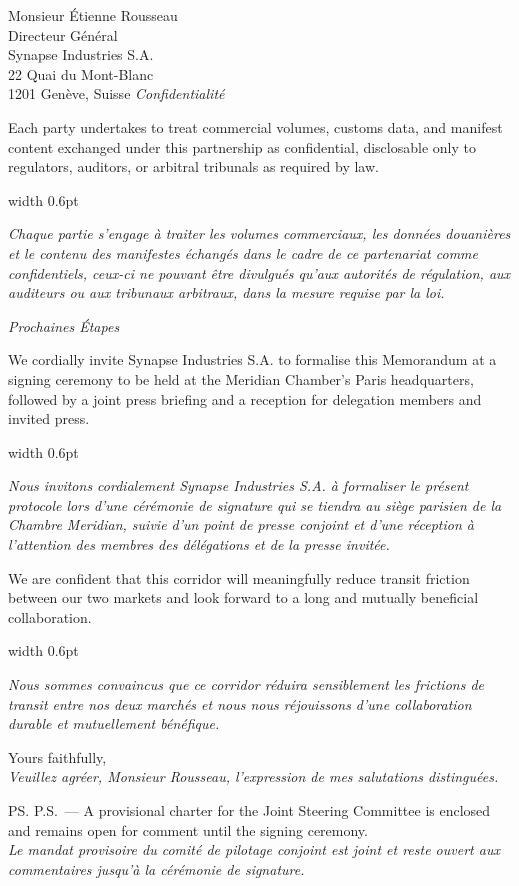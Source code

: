 \documentclass[paper=a4,fontsize=11pt,parskip=half,DIV=11,headsepline,footsepline,addrfield=true,backaddress=false,locfield=narrow,foldmarks=off,enlargefirstpage=on]{scrlttr2}
\newcommand{\bilingual}[2]{%
\noindent\begin{minipage}[t]{0.475\textwidth}\raggedright\small #1\end{minipage}\hspace{0.012\textwidth}%
{\color{gold}\vrule width 0.6pt}\hspace{0.012\textwidth}%
\begin{minipage}[t]{0.475\textwidth}\raggedright\small\itshape #2\end{minipage}\par\smallskip
}
\newcommand{\sectiontitle}[2]{%
\vspace{2pt}\noindent{\color{navy}\bfseries\large #1}\hfill{\color{gold}\itshape\small #2}\par
\noindent{\color{gold}\rule{\dimexpr\linewidth-11pt\relax}{0.7pt}}\par\smallskip
}
\begin{document}
\begin{letter}{Monsieur \'Etienne Rousseau\\Directeur G\'en\'eral\\Synapse Industries S.A.\\22 Quai du Mont-Blanc\\1201 Gen\`eve, Suisse}
\sectiontitle{Confidentiality}{Confidentialit\'e}

\bilingual{%
Each party undertakes to treat commercial volumes, customs data, and manifest content exchanged under this partnership as confidential, disclosable only to regulators, auditors, or arbitral tribunals as required by law.
}{%
Chaque partie s'engage \`a traiter les volumes commerciaux, les donn\'ees douani\`eres et le contenu des manifestes \'echang\'es dans le cadre de ce partenariat comme confidentiels, ceux-ci ne pouvant \^etre divulgu\'es qu'aux autorit\'es de r\'egulation, aux auditeurs ou aux tribunaux arbitraux, dans la mesure requise par la loi.
}

\sectiontitle{Next Steps}{Prochaines \'Etapes}

\bilingual{%
We cordially invite Synapse Industries S.A. to formalise this Memorandum at a signing ceremony to be held at the Meridian Chamber's Paris headquarters, followed by a joint press briefing and a reception for delegation members and invited press.
}{%
Nous invitons cordialement Synapse Industries S.A. \`a formaliser le pr\'esent protocole lors d'une c\'er\'emonie de signature qui se tiendra au si\`ege parisien de la Chambre Meridian, suivie d'un point de presse conjoint et d'une r\'eception \`a l'attention des membres des d\'el\'egations et de la presse invit\'ee.
}

\bilingual{%
We are confident that this corridor will meaningfully reduce transit friction between our two markets and look forward to a long and mutually beneficial collaboration.
}{%
Nous sommes convaincus que ce corridor r\'eduira sensiblement les frictions de transit entre nos deux march\'es et nous nous r\'ejouissons d'une collaboration durable et mutuellement b\'en\'efique.
}

\closing{Yours faithfully,\\[2pt]\textit{Veuillez agr\'eer, Monsieur Rousseau, l'expression de mes salutations distingu\'ees.}}

\ps{P.S.\ --- A provisional charter for the Joint Steering Committee is enclosed and remains open for comment until the signing ceremony.\\
\textit{Le mandat provisoire du comit\'e de pilotage conjoint est joint et reste ouvert aux commentaires jusqu'\`a la c\'er\'emonie de signature.}}



\end{letter}
\end{document}

